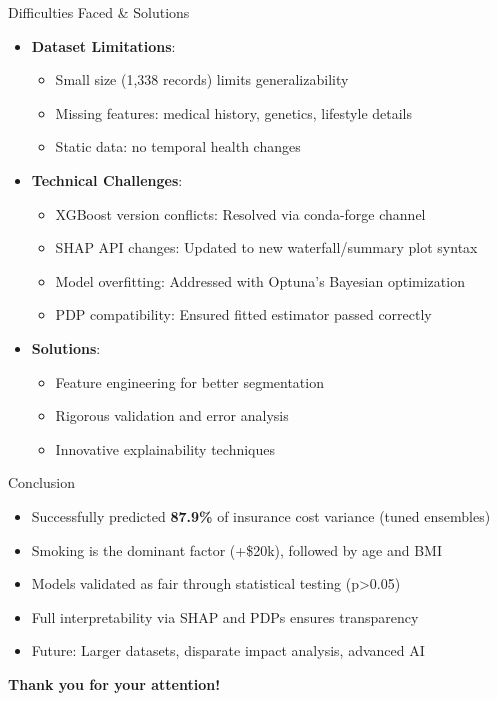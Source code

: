 \documentclass[10pt]{beamer}
\begin{document}
\begin{frame}{Difficulties Faced \& Solutions}
\begin{itemize}
\item \textbf{Dataset Limitations}:
  \begin{itemize}
  \item Small size (1,338 records) limits generalizability
  \item Missing features: medical history, genetics, lifestyle details
  \item Static data: no temporal health changes
  \end{itemize}
\item \textbf{Technical Challenges}:
  \begin{itemize}
  \item XGBoost version conflicts: Resolved via conda-forge channel
  \item SHAP API changes: Updated to new waterfall/summary plot syntax
  \item Model overfitting: Addressed with Optuna's Bayesian optimization
  \item PDP compatibility: Ensured fitted estimator passed correctly
  \end{itemize}
\item \textbf{Solutions}:
  \begin{itemize}
  \item Feature engineering for better segmentation
  \item Rigorous validation and error analysis
  \item Innovative explainability techniques
  \end{itemize}
\end{itemize}
\end{frame}

\begin{frame}{Conclusion}
\begin{itemize}
\item Successfully predicted \textbf{87.9\%} of insurance cost variance (tuned ensembles)
\item Smoking is the dominant factor (+\$20k), followed by age and BMI
\item Models validated as fair through statistical testing (p>0.05)
\item Full interpretability via SHAP and PDPs ensures transparency
\item Future: Larger datasets, disparate impact analysis, advanced AI
\end{itemize}
\begin{center}
\textbf{Thank you for your attention!}
\end{center}
\end{frame}
\end{document}

